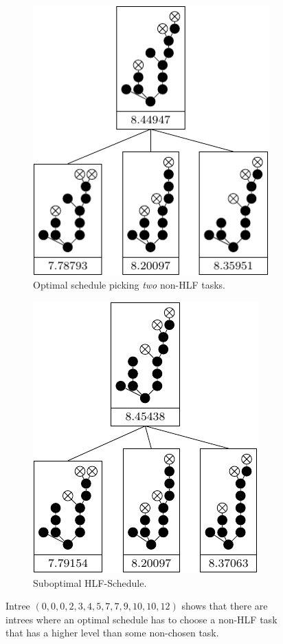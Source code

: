 \begin{figure}[ht]
  \centering
  \begin{subfigure}{.45\textwidth}
    \centering
    \includegraphics{p3/only_high_or_low/0002345779101012_opt.pdf}
    \caption{Optimal schedule picking \emph{two} non-HLF tasks.}
  \end{subfigure}
  \quad
  \begin{subfigure}{.45\textwidth}
    \centering
    \includegraphics{p3/only_high_or_low/0002345779101012_subopt.pdf}
    \caption{Suboptimal HLF-Schedule.}
  \end{subfigure}
  \caption{Intree $(0,0,0,2,3,4,5,7,7,9,10,10,12)$ shows that there are intrees where an optimal schedule has to choose a non-HLF task that has a higher level than some non-chosen task.}
  \label{fig:only-high-or-low-not-optimal}
\end{figure}


